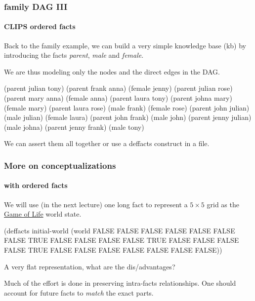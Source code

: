 \documentclass[xcolor={usenames,dvipsnames,svgnames}, compress]{beamer}
\begin{document}
\begin{frame}[fragile]
  \frametitle{family DAG III}
  \framesubtitle{CLIPS ordered facts}
  Back to the family example, we can build a very simple knowledge base (kb) by introducing the facts
  \emph{parent}, \emph{male} and \emph{female}.\par\bigskip
  We are thus modeling only the nodes and the direct edges in the DAG.
  \begin{minipage}[t]{1.0\linewidth}
    \begin{clips-code}[numbers=none]
      (parent julian tony)   (parent frank anna)   (female jenny) 
      (parent julian rose)   (parent mary anna)    (female anna)  
      (parent laura tony)    (parent johna mary)   (female mary)  
      (parent laura rose)    (male frank)          (female rose)    
      (parent john julian)   (male julian)         (female laura)                     
      (parent john frank)    (male john)             
      (parent jenny julian)  (male johna) 
      (parent jenny frank)   (male tony)
    \end{clips-code}
  \end{minipage}\bigskip
  
  We can assert them all together or use a \textsf{deffacts} construct
  in a file.
  
\end{frame}

\begin{frame}[fragile]
  \frametitle{More on conceptualizations}
  \framesubtitle{with ordered facts}
  We will use (in the next lecture) one long fact to represent a $5\times5$ grid as the
  \href{http://en.wikipedia.org/wiki/Conway\%27s_Game_of_Life}{\textsf{Game of Life}} world state.
  \begin{clips-code}[numbers=none]
    (deffacts initial-world
        (world FALSE FALSE FALSE FALSE FALSE
               FALSE FALSE TRUE FALSE FALSE
               FALSE FALSE TRUE FALSE FALSE
               FALSE FALSE TRUE FALSE FALSE
               FALSE FALSE FALSE FALSE FALSE))
  \end{clips-code}
  A very flat representation, what are the dis/advantages?\par\bigskip
  
  Much of the effort is done in preserving intra-facts
  relationships. One should account for future facts to \emph{match}
  the exact parts.
\end{frame}
\end{document}
